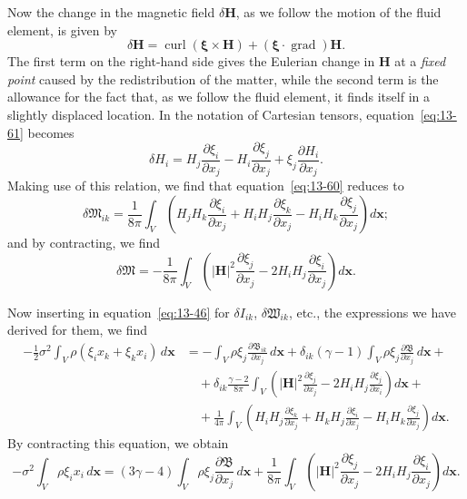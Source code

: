 Now the change in the magnetic field $\delta\mathbf{H}$, as we follow the motion of the fluid element, is given by
\begin{equation}
\label{eq:13-61}
\delta\mathbf{H} = \operatorname{curl}(\boldsymbol{\xi}\times\mathbf{H}) + (\boldsymbol{\xi}\cdot\operatorname{grad})\mathbf{H}.
\end{equation}
The first term on the right-hand side gives the Eulerian change in $\mathbf{H}$ at a \textit{fixed point} caused by the redistribution of the matter, while the second term is the allowance for the fact that, as we follow the fluid element, it finds itself in a slightly displaced location. In the notation of Cartesian tensors, equation~\eqref{eq:13-61} becomes
\begin{equation}
\label{eq:13-62}
\delta H_i = H_j\frac{\partial\xi_i}{\partial x_j} - H_i\frac{\partial\xi_j}{\partial x_j} + \xi_j\frac{\partial H_i}{\partial x_j}.
\end{equation}
Making use of this relation, we find that equation~\eqref{eq:13-60} reduces to
\begin{equation}
\label{eq:13-63}
\delta\mathfrak{M}_{ik} = \frac{1}{8\pi}\int_V\!\left(H_j H_k\frac{\partial\xi_i}{\partial x_j} + H_i H_j\frac{\partial\xi_k}{\partial x_j} - H_i H_k\frac{\partial\xi_j}{\partial x_j}\right)d\mathbf{x};
\end{equation}
and by contracting, we find
\begin{equation}
\label{eq:13-64}
\delta\mathfrak{M} = -\frac{1}{8\pi}\int_V\!\left(|\mathbf{H}|^2\frac{\partial\xi_j}{\partial x_j} - 2H_i H_j\frac{\partial\xi_i}{\partial x_j}\right)d\mathbf{x}.
\end{equation}

Now inserting in equation~\eqref{eq:13-46} for $\delta I_{ik}$, $\delta\mathfrak{W}_{ik}$, etc., the expressions we have derived for them, we find
\begin{equation}
\label{eq:13-65}
\begin{split}
-\tfrac{1}{2}\sigma^2\int_V \rho(\xi_i x_k + \xi_k x_i)\,d\mathbf{x}
&= -\int_V \rho\xi_j\frac{\partial\mathfrak{B}_{ik}}{\partial x_j}\,d\mathbf{x} + \delta_{ik}(\gamma-1)\int_V \rho\xi_j\frac{\partial\mathfrak{B}}{\partial x_j}\,d\mathbf{x} + \\
&\quad + \delta_{ik}\frac{\gamma-2}{8\pi}\int_V\!\left(|\mathbf{H}|^2\frac{\partial\xi_j}{\partial x_j} - 2H_i H_j\frac{\partial\xi_j}{\partial x_i}\right)d\mathbf{x} + \\
&\quad + \frac{1}{4\pi}\int_V\!\left(H_i H_j\frac{\partial\xi_k}{\partial x_j} + H_k H_j\frac{\partial\xi_i}{\partial x_j} - H_i H_k\frac{\partial\xi_j}{\partial x_j}\right)d\mathbf{x}.
\end{split}
\end{equation}
By contracting this equation, we obtain
\begin{equation}
\label{eq:13-66}
-\sigma^2\int_V \rho\xi_i x_i\,d\mathbf{x}
= (3\gamma-4)\int_V \rho\xi_j\frac{\partial\mathfrak{B}}{\partial x_j}\,d\mathbf{x} + \frac{1}{8\pi}\int_V\!\left(|\mathbf{H}|^2\frac{\partial\xi_j}{\partial x_j} - 2H_i H_j\frac{\partial\xi_i}{\partial x_j}\right)d\mathbf{x}.
\end{equation}

